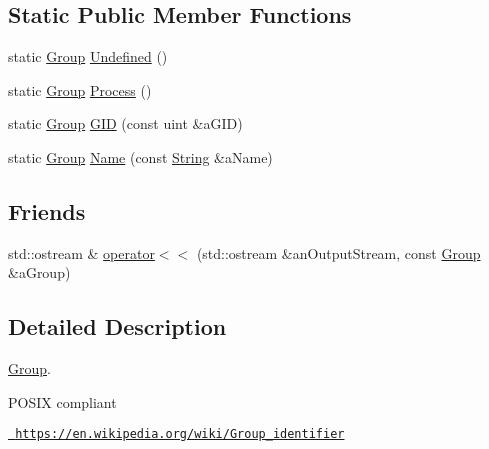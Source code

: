 \subsection*{Static Public Member Functions}
\begin{DoxyCompactItemize}
\item 
static \mbox{\hyperlink{classlibrary_1_1core_1_1system_1_1_group}{Group}} \mbox{\hyperlink{classlibrary_1_1core_1_1system_1_1_group_a50c939824e28f2ce5a0ff7ab253689e4}{Undefined}} ()
\item 
static \mbox{\hyperlink{classlibrary_1_1core_1_1system_1_1_group}{Group}} \mbox{\hyperlink{classlibrary_1_1core_1_1system_1_1_group_a90961dc55447dca842c5f0ea43778c18}{Process}} ()
\item 
static \mbox{\hyperlink{classlibrary_1_1core_1_1system_1_1_group}{Group}} \mbox{\hyperlink{classlibrary_1_1core_1_1system_1_1_group_a6f6e71dd112ccb60347fa366e61cd4e9}{G\+ID}} (const uint \&a\+G\+ID)
\item 
static \mbox{\hyperlink{classlibrary_1_1core_1_1system_1_1_group}{Group}} \mbox{\hyperlink{classlibrary_1_1core_1_1system_1_1_group_a81dda2a1d0e251b40dabbde24be380d1}{Name}} (const \mbox{\hyperlink{classlibrary_1_1core_1_1types_1_1_string}{String}} \&a\+Name)
\end{DoxyCompactItemize}
\subsection*{Friends}
\begin{DoxyCompactItemize}
\item 
std\+::ostream \& \mbox{\hyperlink{classlibrary_1_1core_1_1system_1_1_group_adae6b8468d9a0cf648a52c296c6db73a}{operator$<$$<$}} (std\+::ostream \&an\+Output\+Stream, const \mbox{\hyperlink{classlibrary_1_1core_1_1system_1_1_group}{Group}} \&a\+Group)
\end{DoxyCompactItemize}


\subsection{Detailed Description}
\mbox{\hyperlink{classlibrary_1_1core_1_1system_1_1_group}{Group}}. 

\begin{DoxyVerb}                        POSIX compliant
\end{DoxyVerb}


\href{https://en.wikipedia.org/wiki/Group_identifier}{\texttt{ https\+://en.\+wikipedia.\+org/wiki/\+Group\+\_\+identifier}} 

